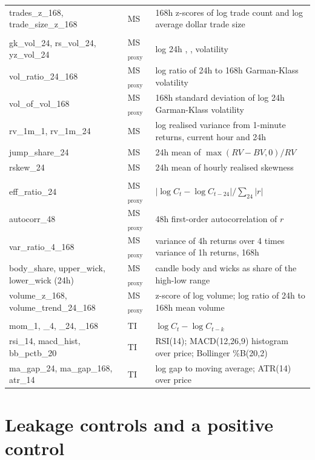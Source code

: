 \begin{table}[H]
\begin{tabular}{>{\raggedright\arraybackslash}p{4.4cm}>{\raggedright\arraybackslash}p{2.1cm}p{8.4cm}}
trades\_z\_168, trade\_size\_z\_168 & MS & 168h z-scores of log trade count and log average dollar trade size\\
\multicolumn{3}{l}{\emph{Volatility}}\\
gk\_vol\_24, rs\_vol\_24, yz\_vol\_24 & MS$_{\text{proxy}}$ & log 24h \citet{garman1980}, \citet{rogers1991}, \citet{yang2000} volatility\\
vol\_ratio\_24\_168 & MS$_{\text{proxy}}$ & log ratio of 24h to 168h Garman-Klass volatility\\
vol\_of\_vol\_168 & MS$_{\text{proxy}}$ & 168h standard deviation of log 24h Garman-Klass volatility\\
rv\_1m\_1, rv\_1m\_24 & MS & log realised variance from 1-minute returns, current hour and 24h\\
jump\_share\_24 & MS & 24h mean of $\max(RV-BV,0)/RV$ \citep{bns2004}\\
rskew\_24 & MS & 24h mean of hourly realised skewness \citep{amaya2015}\\
\multicolumn{3}{l}{\emph{Efficiency, bar structure, activity}}\\
eff\_ratio\_24 & MS$_{\text{proxy}}$ & $|\log C_t-\log C_{t-24}|/\sum_{24}|r|$\\
autocorr\_48 & MS$_{\text{proxy}}$ & 48h first-order autocorrelation of $r$\\
var\_ratio\_4\_168 & MS$_{\text{proxy}}$ & variance of 4h returns over 4 times variance of 1h returns, 168h\\
body\_share, upper\_wick, lower\_wick (24h) & MS$_{\text{proxy}}$ & candle body and wicks as share of the high-low range\\
volume\_z\_168, volume\_trend\_24\_168 & MS$_{\text{proxy}}$ & z-score of log volume; log ratio of 24h to 168h mean volume\\
\multicolumn{3}{l}{\emph{Technical controls}}\\
mom\_1, \_4, \_24, \_168 & TI & $\log C_t-\log C_{t-k}$\\
rsi\_14, macd\_hist, bb\_pctb\_20 & TI & RSI(14); MACD(12,26,9) histogram over price; Bollinger \%B(20,2)\\
ma\_gap\_24, ma\_gap\_168, atr\_14 & TI & log gap to moving average; ATR(14) over price\\
\bottomrule
\end{tabular}
\end{table}

\section{Leakage controls and a positive control}\label{app:leakage}

